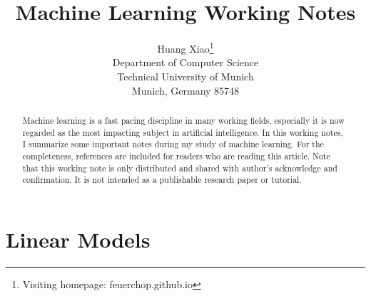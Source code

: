 \documentclass{article}
\title{Machine Learning Working Notes}
\author{
	Huang Xiao\thanks{Visiting homepage: feuerchop.github.io} \\
	Department of Computer Science\\
	Technical University of Munich\\
	Munich, Germany 85748 \\
}
\begin{document}
\maketitle


\begin{abstract}
	Machine learning is a fast pacing discipline in many working fields, especially it is now regarded as the most impacting subject in artificial intelligence. In this working notes, I summarize some important notes during my study of machine learning. For the completeness, references are included for readers who are reading this article. Note that this working note is only distributed and shared with author's acknowledge and confirmation. It is not intended as a publishable research paper or tutorial.

\end{abstract}
\section{Linear Models}
\end{document}
